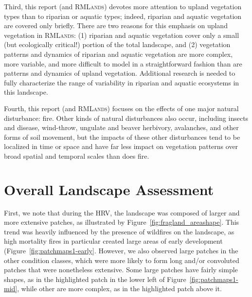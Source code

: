Third, this report (and \textsc{RMLands}) devotes more attention to upland vegetation types than to riparian or aquatic types; indeed, riparian and aquatic vegetation are covered only briefly. There are two reasons for this emphasis on upland vegetation in \textsc{RMLands}: (1) riparian and aquatic vegetation cover only a small (but ecologically critical!) portion of the total landscape, and (2) vegetation patterns and dynamics of riparian and aquatic vegetation are more complex, more variable, and more difficult to model in a straightforward fashion than are patterns and dynamics of upland vegetation. Additional research is needed to fully characterize the range of variability in riparian and aquatic ecosystems in this landscape. 

Fourth, this report (and \textsc{RMLands}) focuses on the effects of one major natural disturbance: fire. Other kinds of natural disturbances also occur, including insects and disease, wind-throw, ungulate and beaver herbivory, avalanches, and other forms of soil movement, but the impacts of these other disturbances tend to be localized in time or space and have far less impact on vegetation patterns over broad spatial and temporal scales than does fire.


\clearpage
\section{Overall Landscape Assessment}

First, we note that during the HRV, the landscape was composed of larger and more extensive patches, as illustrated by Figure~\ref{fig:fragland_areashape}. This trend was heavily influenced by the presence of wildfires on the landscape, as high mortality fires in particular created large areas of early development (Figure~\ref{fig:patchmaps1-early}. However, we also observed large patches in the other condition classes, which were more likely to form long and/or convoluted patches that were nonetheless extensive. Some large patches have fairly simple shapes, as in the highlighted patch in the lower left of Figure~\ref{fig:patchmaps1-mid}, while other are more complex, as in the highlighted patch above it.

